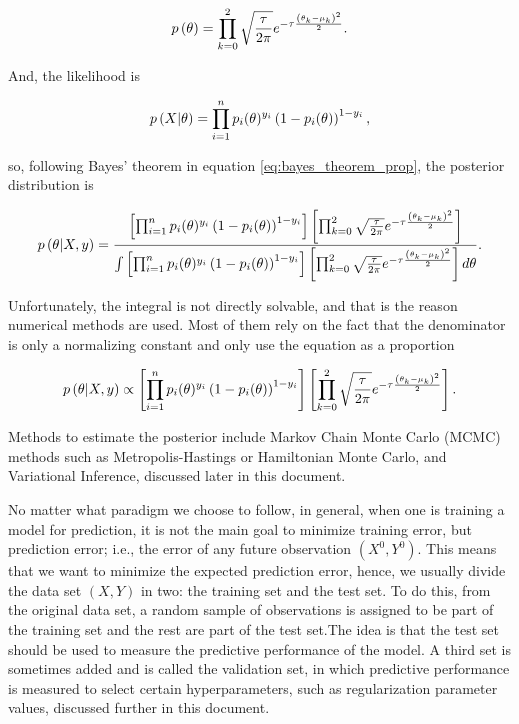 $$
  p\left( \theta \right) = \prod_{k = 0}^2 \sqrt{\frac{\tau}{2 \pi}} e^{- \tau \frac{\left( \theta_k - \mu_k \right)^2}{2}}.
$$

And, the likelihood is

$$
  p\left( X | \theta \right) = \prod_{i = 1}^n  p_i(\theta)^{y_i}\left(1 - p_i(\theta) \right)^{1 - y_i},
$$

so, following Bayes' theorem in equation \ref{eq:bayes_theorem_prop}, the posterior distribution is

$$
  p\left( \theta | X, y \right) =
    \frac
    {
      \left[ \prod_{i = 1}^n  p_i(\theta)^{y_i}\left(1 - p_i(\theta) \right)^{1 - y_i} \right]
      \left[ \prod_{k = 0}^2 \sqrt{\frac{\tau}{2 \pi}} e^{- \tau \frac{\left( \theta_k - \mu_k \right)^2}{2}} \right]
    }{
      \int \left[ \prod_{i = 1}^n  p_i(\theta)^{y_i}\left(1 - p_i(\theta) \right)^{1 - y_i} \right]
      \left[ \prod_{k = 0}^2 \sqrt{\frac{\tau}{2 \pi}} e^{- \tau \frac{\left( \theta_k - \mu_k \right)^2}{2}} \right] d\theta
    }.
$$

Unfortunately, the integral is not directly solvable, and that is the reason numerical methods are used. Most of them rely on the fact that the denominator is only a normalizing constant and only use the equation as a proportion

$$
  p\left( \theta | X, y \right) \propto
  \left[ \prod_{i = 1}^n  p_i(\theta)^{y_i}\left(1 - p_i(\theta) \right)^{1 - y_i} \right]
  \left[ \prod_{k = 0}^2 \sqrt{\frac{\tau}{2 \pi}} e^{- \tau \frac{\left( \theta_k - \mu_k \right)^2}{2}} \right].
$$

Methods to estimate the posterior include Markov Chain Monte Carlo (MCMC) methods such as Metropolis-Hastings or Hamiltonian Monte Carlo, and Variational Inference, discussed later in this document.

No matter what paradigm we choose to follow, in general, when one is training a model for prediction, it is not the main goal to minimize training error, but prediction error; i.e., the error of any future observation $(X^0, Y^0)$. This means that we want to minimize the expected prediction error, hence, we usually divide the data set $(X, Y)$ in two: the training set and the test set. To do this, from the original data set, a random sample of observations is assigned to be part of the training set and the rest are part of the test set.The idea is that the test set should be used to measure the predictive performance of the model. A third set is sometimes added and is called the validation set, in which predictive performance is measured to select certain hyperparameters, such as regularization parameter values, discussed further in this document.


